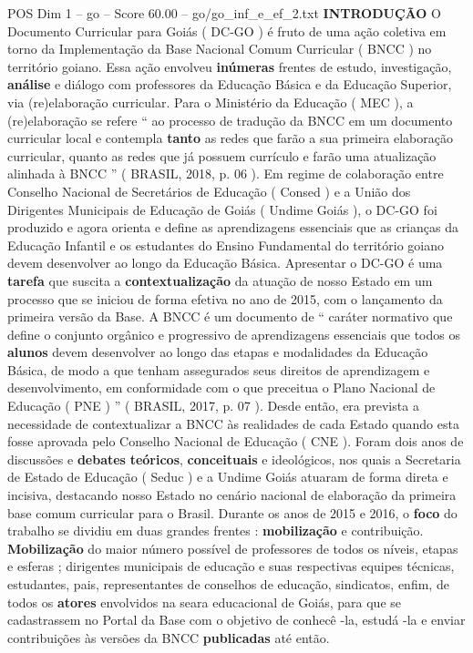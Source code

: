 \begin{textsample}{POS Dim 1 – go – Score 60.00 – go/go\_inf\_e\_ef\_2.txt}  \label{ex:f1_pos_094}
\textbf{INTRODUÇÃO} O Documento Curricular para Goiás ( DC-GO ) é fruto de uma ação coletiva em torno da Implementação da Base Nacional Comum Curricular ( BNCC ) no território goiano.
Essa ação envolveu \textbf{inúmeras} frentes de estudo, investigação, \textbf{análise} e diálogo com professores da Educação Básica e da Educação Superior, via (re)elaboração curricular.
Para o Ministério da Educação ( MEC ), a (re)elaboração se refere “ ao processo de tradução da BNCC em um documento curricular local e contempla \textbf{tanto} as redes que farão a sua primeira elaboração curricular, quanto as redes que já possuem currículo e farão uma atualização alinhada à BNCC ” ( BRASIL, 2018, p. 06 ).
Em regime de colaboração entre Conselho Nacional de Secretários de Educação ( Consed ) e a União dos Dirigentes Municipais de Educação de Goiás ( Undime Goiás ), o DC-GO foi produzido e agora orienta e define as aprendizagens essenciais que as crianças da Educação Infantil e os estudantes do Ensino Fundamental do território goiano devem desenvolver ao longo da Educação Básica.
Apresentar o DC-GO é uma \textbf{tarefa} que suscita a \textbf{contextualização} da atuação de nosso Estado em um processo que se iniciou de forma efetiva no ano de 2015, com o lançamento da primeira versão da Base.
A BNCC é um documento de “ caráter normativo que define o conjunto orgânico e progressivo de aprendizagens essenciais que todos os \textbf{alunos} devem desenvolver ao longo das etapas e modalidades da Educação Básica, de modo a que tenham assegurados seus direitos de aprendizagem e desenvolvimento, em conformidade com o que preceitua o Plano Nacional de Educação ( PNE ) ” ( BRASIL, 2017, p. 07 ).
Desde então, era prevista a necessidade de contextualizar a BNCC às realidades de cada Estado quando esta fosse aprovada pelo Conselho Nacional de Educação ( CNE ).
Foram dois anos de discussões e \textbf{debates} \textbf{teóricos}, \textbf{conceituais} e ideológicos, nos quais a Secretaria de Estado de Educação ( Seduc ) e a Undime Goiás atuaram de forma direta e incisiva, destacando nosso Estado no cenário nacional de elaboração da primeira base comum curricular para o Brasil.
Durante os anos de 2015 e 2016, o \textbf{foco} do trabalho se dividiu em duas grandes frentes : \textbf{mobilização} e contribuição. \textbf{Mobilização} do maior número possível de professores de todos os níveis, etapas e esferas ; dirigentes municipais de educação e suas respectivas equipes técnicas, estudantes, pais, representantes de conselhos de educação, sindicatos, enfim, de todos os \textbf{atores} envolvidos na seara educacional de Goiás, para que se cadastrassem no Portal da Base com o objetivo de conhecê -la, estudá -la e enviar contribuições às versões da BNCC \textbf{publicadas} até então.

\end{textsample}
